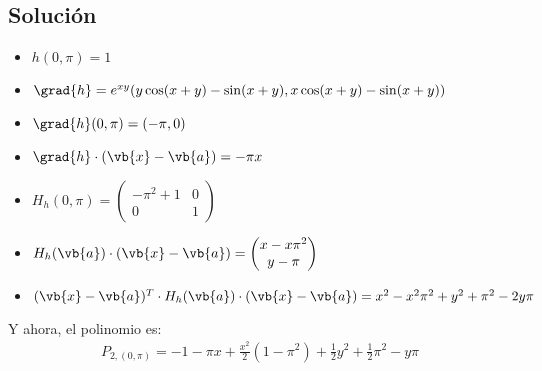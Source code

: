 \documentclass[12pt,a4paper,reqno]{article}
\begin{document}
\begin{enumerate}[label={(\alph*)}]
		\subsection*{Solución}
		\begin{itemize}
			\item $h(0, \pi)=1$
			\item $\grad{h}=e^{xy}(y\cos(x+y)-\sin(x+y),x\cos(x+y)-\sin(x+y))$
			\item $\grad{h}(0,\pi)=(-\pi,0)$
			\item $\grad{h}\cdot (\vb{x}-\vb{a})=-\pi x$
			\item $H_{h}(0,\pi)= \begin{pmatrix}
					-\pi ^{2}+1 & 0 \\ 0 & 1
			\end{pmatrix}
			$
		\item $H_{h}(\vb{a})\cdot (\vb{x}-\vb{a})= \begin{pmatrix} 
				x-x\pi ^{2}\\y-\pi
			\end{pmatrix} $ 
		\item $(\vb{x}-\vb{a})^{T}\cdot H_{h}(\vb{a})\cdot (\vb{x}-\vb{a})=
				x ^{2}-x ^{2}\pi ^{2}+y ^{2}+ \pi ^{2} -2y\pi
			$ 
		\end{itemize}		
	Y ahora, el polinomio es:
	\begin{equation}
		\begin{split}
			P_{2,(0,\pi)} = -1-\pi x + \frac{x ^{2}}{2}(1-\pi ^{2}) +\frac{1}{2} y ^{2} +\frac{1}{2} \pi ^{2} -y \pi
		\end{split}
	\end{equation}
	\end{enumerate}	
\end{document}
